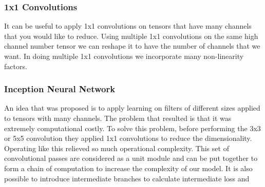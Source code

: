 \documentclass{article}
\begin{document}
\subsubsection*{1x1 Convolutions}
It can be useful to apply 1x1 convolutions on tensors that have many channels that you would like to reduce. Using multiple 1x1 convolutions on the same high channel number tensor we can reshape it to have the number of channels that we want. In doing multiple 1x1 convolutions we incorporate many non-linearity factors.
\subsubsection*{Inception Neural Network}
An idea that was proposed is to apply learning on filters of different sizes applied to tensors with many channels. The problem that resulted is that it was extremely computational costly. To solve this problem, before performing the 3x3 or 5x5 convolution they applied 1x1 convolutions to reduce the dimensionality. Operating like this relieved so much operational complexity. This set of convolutional passes are considered as a unit module and can be put together to form a chain of computation to increase the complexity of our model. It is also possible to introduce intermediate branches to calculate intermediate loss and 


\end{document}
